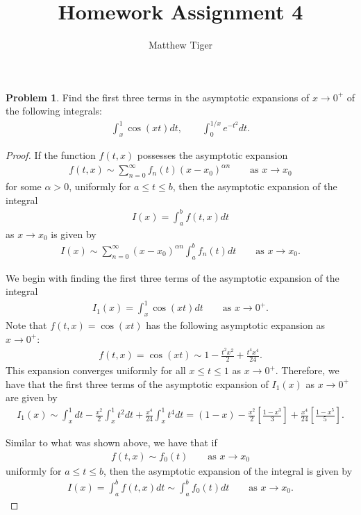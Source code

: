 \documentclass[12pt]{article}
\title{Homework Assignment 4}
\author{Matthew Tiger}
\theoremstyle{definition}
\newtheorem{problem}{Problem}
\begin{document}
\maketitle


\begin{problem}
  Find the first three terms in the asymptotic expansions of $x \to 0^+$ of the following
  integrals:
  \begin{align*}
    \int_x^1 \cos(xt)dt, \qquad \int_0^{1/x} e^{-t^2}dt.
  \end{align*}
\end{problem}

\begin{proof}
  If the function $f(t,x)$ possesses the asymptotic expansion
  \begin{align*}
    f(t,x) \sim \sum_{n=0}^\infty f_n(t) (x- x_0)^{\alpha n} \qquad \text{as $x \to x_0$}
  \end{align*}
  for some $\alpha > 0$, uniformly for $a \leq t \leq b$,
  then the asymptotic expansion of the integral
  \begin{align*}
    I(x) = \int_a^b f(t,x) dt
  \end{align*}
  as $x \to x_0$ is given by
  \begin{align*}
    I(x) \sim \sum_{n=0}^\infty(x- x_0)^{\alpha n} \int_a^b f_n(t) dt  \qquad \text{as $x \to x_0$}.
  \end{align*}

  We begin with finding the first three terms of the asymptotic expansion of the integral
  \begin{align*}
    I_1(x) = \int_x^1 \cos(xt)dt \qquad \text{as $x\to 0^+$}.
  \end{align*}
  Note that $f(t,x) = \cos(xt)$ has the following asymptotic expansion
  as $x \to 0^+$:
  \begin{align*}
    f(t, x) = \cos(xt) \sim 1 - \frac{t^2x^2}{2} + \frac{t^4 x^4}{24}.
  \end{align*}
  This expansion converges uniformly for all $x \leq t \leq 1$ as $x \to 0^+$.
  Therefore, we have that the first three terms of the asymptotic expansion
  of $I_1(x)$ as $x\to 0^+$ are given by
  \begin{align*}
    I_1(x) \sim \int_x^1 dt - \frac{x^2}{2} \int_x^1 t^2 dt + \frac{x^4}{24}  \int_x^1 t^4 dt = (1-x) - \frac{x^2}{2}\left[\frac{1-x^3}{3}\right] + \frac{x^4}{24}\left[\frac{1-x^5}{5}\right].
  \end{align*}

  Similar to what was shown above, we have that if
  \begin{align*}
    f(t,x) \sim f_0(t) \qquad \text{as $x \to x_0$}
  \end{align*}
  uniformly for $a \leq t \leq b$, then the asymptotic expansion of the integral
  is given by
  \begin{align*}
    I(x) = \int_a^b f(t,x) dt \sim \int_a^b f_0(t) dt \qquad \text{as $x \to x_0$}.
  \end{align*}


\end{proof}
\end{document}
